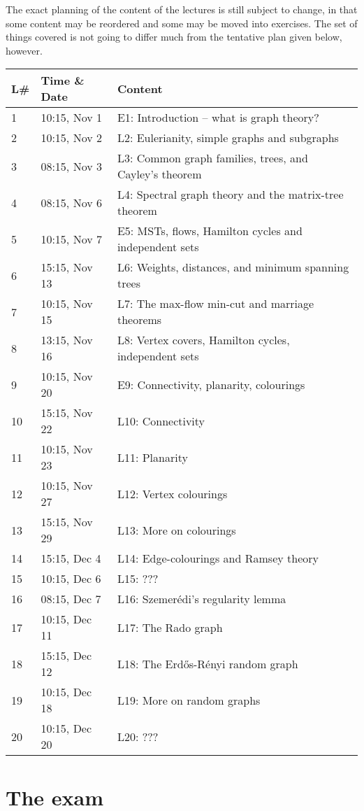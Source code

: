 \documentclass{tufte-handout}
\begin{document}
The exact planning of the content of the lectures is still subject to change, in that some content may be reordered and some may be moved into exercises. The set of things covered is not going to differ much from the tentative plan given below, however.

\begin{table}[h]
\begin{tabularx}{\textwidth}{llX}
L\# & Time \& Date      & Content \\ 
\midrule
1  & 10:15, Nov 1 & E1: Introduction -- what is graph theory?\\
2  & 10:15, Nov 2 & L2: Eulerianity, simple graphs and subgraphs\\
3  & 08:15, Nov 3 & L3: Common graph families, trees, and Cayley's theorem\\
4  & 08:15, Nov 6 & L4: Spectral graph theory and the matrix-tree theorem\\
5  & 10:15, Nov 7 & E5: MSTs, flows, Hamilton cycles and independent sets\\
6  & 15:15, Nov 13 & L6: Weights, distances, and minimum spanning trees\\
7  & 10:15, Nov 15 & L7: The max-flow min-cut and marriage theorems\\
8  & 13:15, Nov 16 & L8: Vertex covers, Hamilton cycles, independent sets\\
9  & 10:15, Nov 20 & E9: Connectivity, planarity, colourings\\
10 & 15:15, Nov 22 & L10: Connectivity\\
11 & 10:15, Nov 23 & L11: Planarity\\
12 & 10:15, Nov 27 & L12: Vertex colourings\\
13 & 15:15, Nov 29 & L13: More on colourings\\
14 & 15:15, Dec 4 & L14: Edge-colourings and Ramsey theory\\
15 & 10:15, Dec 6 & L15: ???\\
16 & 08:15, Dec 7 & L16: Szemerédi's regularity lemma\\
17 & 10:15, Dec 11 & L17: The Rado graph\\
18 & 15:15, Dec 12 & L18: The Erd\H{o}s-Rényi random graph\\
19 & 10:15, Dec 18 & L19: More on random graphs\\
20 & 10:15, Dec 20 & L20: ???
\end{tabularx}
\end{table}

\section{The exam}
\end{document}
